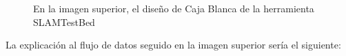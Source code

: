 \begin{figure}[H]
\begin{center}
\hspace{0.5cm}
\end{center}
\caption{ En la imagen superior, el diseño de Caja Blanca de la herramienta SLAMTestBed }
\end{figure}

La explicación al flujo de datos seguido en la imagen superior sería el siguiente:

